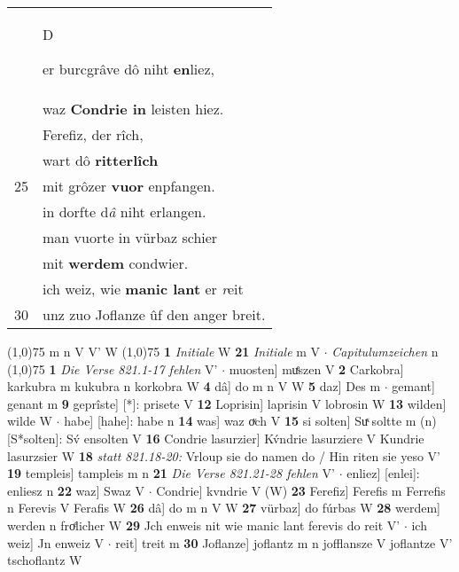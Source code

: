 \documentclass[8pt,a4paper,notitlepage]{article}
\begin{document}
\begin{table}[ht]
\begin{minipage}[t]{0.5\linewidth}
\begin{tabular}{rl}
 & \begin{large}D\end{large}er burcgrâve dô niht \textbf{en}liez,\\ 
 & waz \textbf{Condrie in} leisten hiez.\\ 
 & Ferefiz, der rîch,\\ 
 & wart dô \textbf{ritterlîch}\\ 
25 & mit grôzer \textbf{vuor} enpfangen.\\ 
 & in dorfte d\textit{â} niht erlangen.\\ 
 & man vuorte in vürbaz schier\\ 
 & mit \textbf{werdem} condwier.\\ 
 & ich weiz, wie \textbf{manic lant} er \textit{r}eit\\ 
30 & unz zuo Joflanze ûf den anger breit.\\ 
\end{tabular}
\scriptsize
\line(1,0){75} \newline
m n V V' W \newline
\line(1,0){75} \newline
\textbf{1} \textit{Initiale} W  \textbf{21} \textit{Initiale} m V   $\cdot$ \textit{Capitulumzeichen} n  \newline
\line(1,0){75} \newline
\textbf{1} \textit{Die Verse 821.1-17 fehlen} V'   $\cdot$ muosten] muͤszen V \textbf{2} Carkobra] karkubra m kukubra n korkobra W \textbf{4} dâ] do m n V W \textbf{5} daz] Des m  $\cdot$ gemant] genant m \textbf{9} geprîste] [*]: prisete V \textbf{12} Loprisin] laprisin V lobrosin W \textbf{13} wilden] wilde W  $\cdot$ habe] [hahe]: habe n \textbf{14} was] waz oͮch V \textbf{15} si solten] Suͯ soltte m (n) [S*solten]: Sv́ ensolten  V \textbf{16} Condrie lasurzier] Kv́ndrie lasurziere V Kundrie lasurzsier W \textbf{18} \textit{statt 821.18-20:} Vrloup sie do namen do / Hin riten sie yeso V'  \textbf{19} templeis] tampleis m n \textbf{21} \textit{Die Verse 821.21-28 fehlen} V'   $\cdot$ enliez] [enlei]: enliesz n \textbf{22} waz] Swaz V  $\cdot$ Condrie] kvndrie V (W) \textbf{23} Ferefiz] Ferefis m Ferrefis n Ferevis V Ferafis W \textbf{26} dâ] do m n V W \textbf{27} vürbaz] do fúrbas W \textbf{28} werdem] werden n froͤlicher W \textbf{29} Jch enweis nit wie manic lant ferevis do reit V'  $\cdot$ ich weiz] Jn enweiz V  $\cdot$ reit] treit m \textbf{30} Joflanze] joflantz m n jofflansze V joflantze V' tschoflantz W \newline
\end{minipage}
\end{table}
\end{document}
